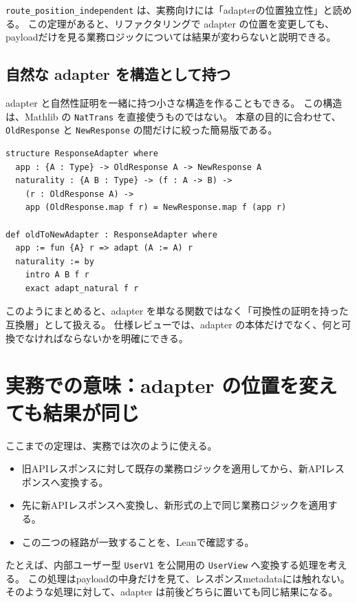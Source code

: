 \texttt{route\_position\_independent} は、実務向けには「adapterの位置独立性」と読める。
この定理があると、リファクタリングで adapter の位置を変更しても、payloadだけを見る業務ロジックについては結果が変わらないと説明できる。

\subsection{自然な adapter を構造として持つ}

adapter と自然性証明を一緒に持つ小さな構造を作ることもできる。
この構造は、Mathlib の \texttt{NatTrans} を直接使うものではない。
本章の目的に合わせて、\texttt{OldResponse} と \texttt{NewResponse} の間だけに絞った簡易版である。

\begin{listing}[htbp]
\begin{verbatim}
structure ResponseAdapter where
  app : {A : Type} -> OldResponse A -> NewResponse A
  naturality : {A B : Type} -> (f : A -> B) ->
    (r : OldResponse A) ->
    app (OldResponse.map f r) = NewResponse.map f (app r)

def oldToNewAdapter : ResponseAdapter where
  app := fun {A} r => adapt (A := A) r
  naturality := by
    intro A B f r
    exact adapt_natural f r
\end{verbatim}
\caption{adapterと自然性証明をまとめる構造}
\label{lst:ch25-response-adapter}
\end{listing}

このようにまとめると、adapter を単なる関数ではなく「可換性の証明を持った互換層」として扱える。
仕様レビューでは、adapter の本体だけでなく、何と可換でなければならないかを明確にできる。

\section{実務での意味：adapter の位置を変えても結果が同じ}

ここまでの定理は、実務では次のように使える。

\begin{itemize}
\item 旧APIレスポンスに対して既存の業務ロジックを適用してから、新APIレスポンスへ変換する。
\item 先に新APIレスポンスへ変換し、新形式の上で同じ業務ロジックを適用する。
\item この二つの経路が一致することを、Leanで確認する。
\end{itemize}

たとえば、内部ユーザー型 \texttt{UserV1} を公開用の \texttt{UserView} へ変換する処理を考える。
この処理はpayloadの中身だけを見て、レスポンスmetadataには触れない。
そのような処理に対して、adapter は前後どちらに置いても同じ結果になる。

